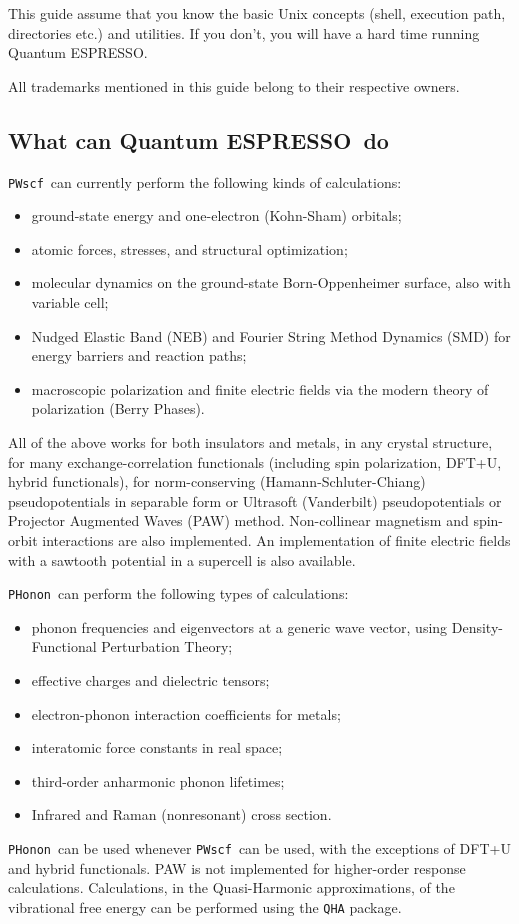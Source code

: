 \documentclass[12pt,a4paper]{article}
\def\qe{{\sc Quantum ESPRESSO}}
\def\PWscf{\texttt{PWscf}}
\def\PHonon{\texttt{PHonon}}
\begin{document}
This guide assume that you know the basic Unix concepts (shell, 
execution path, directories etc.) and utilities. If you don't, 
you will have a hard time running \qe.

All trademarks mentioned in this guide belong to their respective owners.

\subsection{What can \qe\ do}

\PWscf\ can currently perform the following kinds of calculations:
\begin{itemize}
  \item ground-state energy and one-electron (Kohn-Sham) orbitals;
  \item atomic forces, stresses, and structural optimization;
  \item molecular dynamics on the ground-state Born-Oppenheimer surface,  also with variable cell;
  \item Nudged Elastic Band (NEB) and Fourier String Method Dynamics (SMD)
  for energy barriers and reaction paths;
  \item macroscopic polarization and finite electric fields via 
  the modern theory of polarization (Berry Phases).
\end{itemize}
All of the above works for both insulators and metals, 
in any crystal structure, for many exchange-correlation functionals
(including spin polarization, DFT+U, hybrid functionals), for
norm-conserving (Hamann-Schluter-Chiang) pseudopotentials in 
separable form or Ultrasoft (Vanderbilt) pseudopotentials 
or Projector Augmented Waves (PAW) method.
Non-collinear magnetism and spin-orbit interactions 
are also implemented.  An implementation of finite electric 
fields with a sawtooth potential in a supercell is also available.

\PHonon\ can perform the following types of calculations:
\begin{itemize}
  \item phonon frequencies and eigenvectors at a generic wave vector,
  using Density-Functional Perturbation Theory;
  \item effective charges and dielectric tensors;
  \item electron-phonon interaction coefficients for metals;
  \item interatomic force constants in real space;
  \item third-order anharmonic phonon lifetimes;
  \item Infrared and Raman (nonresonant) cross section.
\end{itemize}
\PHonon\ can be used whenever \PWscf\ can be 
used, with the exceptions of DFT+U and hybrid functionals. 
PAW is not implemented for higher-order response calculations.
Calculations, in the Quasi-Harmonic approximations, of the vibrational 
free energy can be performed using the \texttt{QHA}  package.
\end{document}
